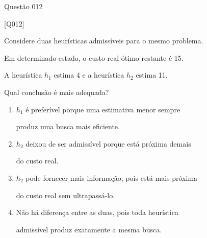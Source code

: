 \documentclass[xcolor=dvipsnames,table]{beamer}
\begin{document}
\begin{frame}{Questão 012}

    \small

    \begin{block}{[Q012]}

        Considere duas heurísticas admissíveis para o mesmo problema.

        Em determinado estado, o custo real ótimo restante é 15.

        A heurística $h_1$ estima 4 e a heurística $h_2$ estima 11.

        Qual conclusão é mais adequada?

    \end{block}

    \begin{enumerate}[label=(\Alph*)]

        \item $h_1$ é preferível porque uma estimativa menor sempre

        produz uma busca mais eficiente.

        \item $h_2$ deixou de ser admissível porque está próxima demais

        do custo real.

        \item $h_2$ pode fornecer mais informação, pois está mais próxima

        do custo real sem ultrapassá-lo.

        \item Não há diferença entre as duas, pois toda heurística

        admissível produz exatamente a mesma busca.

    \end{enumerate}

\end{frame}
\end{document}
